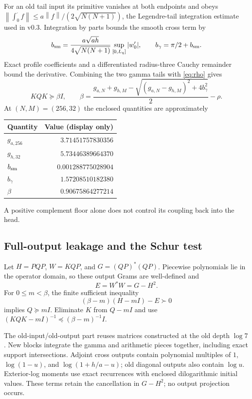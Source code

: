 \documentclass[11pt]{article}
\theoremstyle{remark}\newtheorem{remark}[theorem]{Remark}
\newcommand{\norm}[1]{\left\|#1\right\|}
\begin{document}
For an old tail input its primitive vanishes at both endpoints and obeys
$\norm{\int_0^\cdot f}\le a\norm f/(2\sqrt{N(N+1)})$, the Legendre-tail integration estimate used in v0.3. Integration by parts bounds the smooth cross term by
\[
 b_{\rm sm}=\frac{a\sqrt{ah}}{4\sqrt{N(N+1)}}\sup_{[0,L_q]}|w_0'|,\qquad
 b_\gamma=\pi/2+b_{\rm sm}.
\]
Exact profile coefficients and a differentiated radius-three Cauchy remainder bound the derivative. Combining the two gamma tails with \eqref{eq:rho} gives
\begin{equation}\label{eq:beta}
 KQK\succeq\beta I,\qquad
 \beta=\frac{g_{a,N}+g_{h,M}-\sqrt{(g_{a,N}-g_{h,M})^2+4b_\gamma^2}}2-\rho.
\end{equation}
At $(N,M)=(256,32)$ the enclosed quantities are approximately
\begin{center}
\begin{tabular}{@{}lr@{}}\toprule
Quantity & Value (display only)\\\midrule
$g_{a,256}$ & $3.71451757830356$\\
$g_{h,32}$ & $5.73446389664370$\\
$b_{\rm sm}$ & $0.001288775028904$\\
$b_\gamma$ & $1.57208510182380$\\
$\beta$ & $0.90675864277214$\\\bottomrule
\end{tabular}
\end{center}
A positive complement floor alone does not control its coupling back into the head.

\subsection{Full-output leakage and the Schur test}\label{sec:leakage}
Let $H=PQP$, $W=KQP$, and $G=(QP)^*(QP)$. Piecewise polynomials lie in the operator domain, so these output Grams are well-defined and
\begin{equation}\label{eq:E}
 E=W^*W=G-H^2.
\end{equation}
For $0\le m<\beta$, the finite sufficient inequality
\begin{equation}\label{eq:schur}
 (\beta-m)(H-mI)-E\succ0
\end{equation}
implies $Q\succeq mI$. Eliminate $K$ from $Q-mI$ and use $(KQK-mI)^{-1}\preceq(\beta-m)^{-1}I$.

The old-input/old-output part reuses matrices constructed at the old depth $\log7$. New blocks integrate the gamma and arithmetic pieces together, including exact support intersections. Adjoint cross outputs contain polynomial multiples of $1$, $\log(1-u)$, and $\log(1+h/a-u)$; old diagonal outputs also contain $\log u$. Exterior-log moments use exact recurrences with enclosed dilogarithmic initial values. These terms retain the cancellation in $G-H^2$; no output projection occurs.
\end{document}
